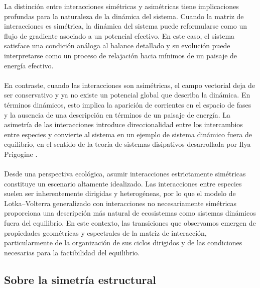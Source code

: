 La distinción entre interacciones simétricas y asimétricas tiene implicaciones profundas para la naturaleza de la dinámica del sistema. Cuando la matriz de interacciones es simétrica, la dinámica del sistema puede reformularse como un flujo de gradiente asociado a un potencial efectivo. En este caso, el sistema satisface una condición análoga al balance detallado y su evolución puede interpretarse como un proceso de relajación hacia mínimos de un paisaje de energía efectivo.\\
\\
En contraste, cuando las interacciones son asimétricas, el campo vectorial deja de ser conservativo y ya no existe un potencial global que describa la dinámica. En términos dinámicos, esto implica la aparición de corrientes en el espacio de fases y la ausencia de una descripción en términos de un paisaje de energía. La asimetría de las interacciones introduce direccionalidad entre los intercambios entre especies y convierte al sistema en un ejemplo de sistema dinámico fuera de equilibrio, en el sentido de la teoría de sistemas disipativos desarrollada por Ilya Prigogine \cite{prigogine1963introduction}.
\\
\\
Desde una perspectiva ecológica, asumir interacciones estrictamente simétricas constituye un escenario altamente idealizado. Las interacciones entre especies suelen ser inherentemente dirigidas y heterogéneas, por lo que el modelo de Lotka--Volterra generalizado con interacciones no necesariamente simétricas proporciona una descripción más natural de ecosistemas como sistemas dinámicos fuera del equilibrio. En este contexto, las transiciones que observamos emergen de propiedades geométricas y espectrales de la matriz de interacción, particularmente de la organización de sus ciclos dirigidos y de las condiciones necesarias para la factibilidad del equilibrio.

\subsection{Sobre la simetría estructural}

